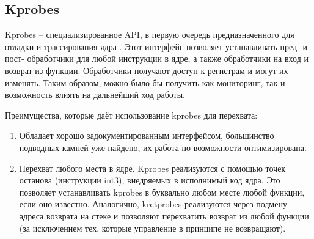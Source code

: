 	\subsection*{Kprobes}
		Kprobes -- специализированное API, в первую очередь предназначенного для отладки и трассирования ядра \cite{kprobes}.
		Этот интерфейс позволяет устанавливать пред- и пост- обработчики для любой инструкции в ядре,
		а также обработчики на вход и возврат из функции. 
		Обработчики получают доступ к регистрам и могут их изменять. 
		Таким образом, можно было бы получить как мониторинг, так и возможность влиять на дальнейший ход работы.

		Преимущества, которые даёт использование kprobes для перехвата:
		\begin{enumerate}
			\item Обладает хорошо задокументированным интерфейсом, 
				большинство подводных камней уже найдено,
				их работа по возможности оптимизирована.
			\item Перехват любого места в ядре. 
				Kprobes реализуются с помощью точек останова (инструкции int3), 
				внедряемых в исполнимый код ядра. 
				Это позволяет устанавливать kprobes в буквально любом месте любой функции, если оно известно.
				Аналогично, kretprobes реализуются через подмену адреса возврата на стеке и позволяют перехватить
				возврат из любой функции (за исключением тех, которые управление в принципе не возвращают).
		\end{enumerate}
		
